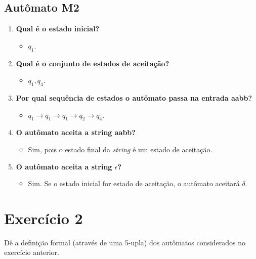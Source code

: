 \documentclass[a4paper, 12pt]{article}
\begin{document}
\subsection{Autômato M2}
\begin{enumerate}
    \item \textbf{Qual é o estado inicial?}
    \begin{itemize}
        \item $q_1$.
    \end{itemize}
    
    
    \item \textbf{Qual é o conjunto de estados de aceitação?}
    \begin{itemize}
        \item ${q_1, q_4}$.
    \end{itemize}
    
    
    \item \textbf{Por qual sequência de estados o autômato passa na entrada aabb?}
    \begin{itemize}
        \item $q_1 \rightarrow q_1 \rightarrow q_1 \rightarrow q_2 \rightarrow q_4$.
    \end{itemize}
    
    
    \item \textbf{O autômato aceita a string aabb?}
    \begin{itemize}
        \item Sim, pois o estado final da \textit{string} é um estado de aceitação.
    \end{itemize}
    
    
    \item \textbf{O autômato aceita a string $\epsilon$?}
    \begin{itemize}
        \item Sim. Se o estado inicial for estado de aceitação, o autômato
            aceitará $\delta$.
    \end{itemize}
\end{enumerate}

\newpage
\section{Exercício 2}

Dê a definição formal (através de uma 5-upla) dos autômatos considerados no exercício anterior.
\end{document}
